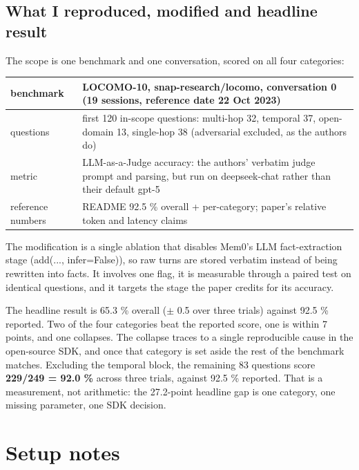 \documentclass[11pt,a4paper]{article}
\begin{document}
\subsection{What I reproduced, modified and headline result}

The scope is one benchmark and one conversation, scored on all four categories:

\begin{center}\small
\begin{tabularx}{\textwidth}{@{}l>{\RaggedRight\arraybackslash}X@{}}
\toprule
\textbf{benchmark} & LOCOMO-10, snap-research/locomo, conversation 0 (19 sessions, reference date 22 Oct 2023) \\
\midrule
questions & first 120 in-scope questions: multi-hop 32, temporal 37, open-domain 13, single-hop 38 (adversarial excluded, as the authors do) \\
metric & LLM-as-a-Judge accuracy: the authors' verbatim judge prompt and parsing, but run on deepseek-chat rather than their default gpt-5 \\
reference numbers & README 92.5 \% overall + per-category; paper's relative token and latency claims \\
\bottomrule
\end{tabularx}
\end{center}

The modification is a single ablation that disables Mem0's LLM fact-extraction stage (add(..., infer=False)), so raw turns are stored verbatim instead of being rewritten into facts. It involves one flag, it is measurable through a paired test on identical questions, and it targets the stage the paper credits for its accuracy.

The headline result is 65.3 \% overall ($\pm$ 0.5 over three trials) against 92.5 \% reported. Two of the four categories beat the reported score, one is within 7 points, and one collapses. The collapse traces to a single reproducible cause in the open-source SDK, and once that category is set aside the rest of the benchmark matches. Excluding the temporal block, the remaining 83 questions score \textbf{229/249 = 92.0 \%} across three trials, against 92.5 \% reported. That is a measurement, not arithmetic: the 27.2-point headline gap is one category, one missing parameter, one SDK decision.

\section{Setup notes}
\end{document}
